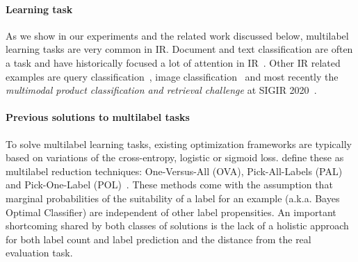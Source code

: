 \paragraph{Learning task}



As we show in our experiments and the related work discussed below, multilabel learning tasks are very common in \ac{IR}. Document and text classification are often a  task and have historically focused a lot of attention in \ac{IR}~\cite{IRClassStat, textCategorization, statTextCategorization, documentClassification}. Other \ac{IR} related examples are query classification~\cite{queryClassification, introIR}, image classification~\cite{imageClassification, faceDetection} and most recently the \textit{multimodal product classification and retrieval challenge} at SIGIR 2020~\cite{Amoualian2020SIGIR2E}. 

\paragraph{Previous solutions to multilabel tasks}
To solve multilabel learning tasks, existing optimization frameworks are typically based on variations of the cross-entropy, logistic or sigmoid loss. \citeauthor{multilabelReduction} define these as multilabel reduction techniques: One-Versus-All (OVA), Pick-All-Labels (PAL) and Pick-One-Label (POL)~\cite{multilabelReduction}. These methods come with the assumption that marginal probabilities of the suitability of a label for an example (a.k.a. Bayes Optimal Classifier) are independent of other label propensities. An important shortcoming shared by both classes of solutions is the lack of a holistic approach for both label count and label prediction and the distance from the real evaluation task.

